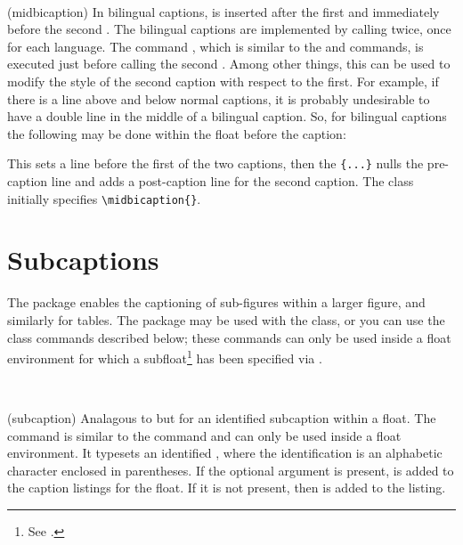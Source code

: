 \begin{syntax}
 \cmd{\midbicaption} \\
\end{syntax}
\glossary(midbicaption)%
  {}%
  {In bilingual captions,  is inserted after the first 
   and immediately before the second .}
 The bilingual captions are implemented by calling \cmd{\caption} twice,
 once for each language. The command \cmd{\midbicaption}, 
 which is similar to the \cmd{\precaption} and \cmd{\postcaption} commands,
 is executed 
 just before calling the second \cmd{\caption}. Among other things,
 this can be used to
 modify the style of the second 
caption with respect to the first.
 For example, if there is a line above and below normal
 captions, it is probably undesirable to have a double line in the
 middle of a bilingual caption. So, for bilingual captions the
 following may be done within the float before the caption:
\begin{lcode}
\precaption{\rule{\linewidth}{0.4pt}\par}
\postcaption{}
\midbicaption{\precaption{}%
              \postcaption{\rule{\linewidth}{0.4pt}}}
\end{lcode}
 This sets a line before the first of the two captions, then the
\cmd{\midbicaption}\verb?{...}? nulls the pre-caption line and adds 
a post-caption line for the second caption. The class initially specifies
\verb?\midbicaption{}?.


 \section{Subcaptions}  \label{sec:subcaps}


     The  package enables the captioning of 
sub-figures within a larger figure, 
and similarly for tables.
The  package may be used with the class, or you
can use the class commands described below; these commands can only
be used inside a float environment for which a 
subfloat\footnote{See .} has been specified
via \cmd{\newsubfloat}.

\begin{syntax}
\cmd{\subcaption} \\
\end{syntax}
\glossary(subcaption)%
  {}%
  {Analagous to  but for an identified subcaption within a float.}
The \cmd{\subcaption} command is similar to the \cmd{\caption} command
and can only be used inside a float environment.
It typesets an identified , where the identification
is an alphabetic character enclosed in parentheses. If the optional
 argument is present,  is added to
the caption listings for the float. If it is not present, then
 is added to the listing.

